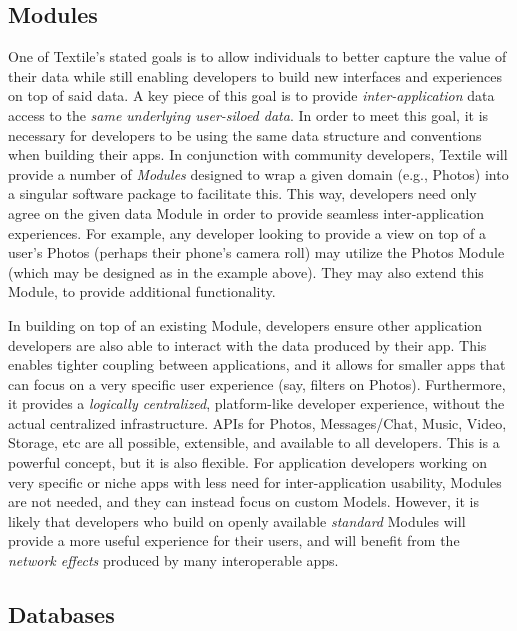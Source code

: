 \documentclass{textile}
\begin{document}
\subsection{Modules}\label{sec:modules}

One of Textile's stated goals is to allow individuals to better capture the value of their data while still enabling developers to build new interfaces and experiences on top of said data. A key piece of this goal is to provide \emph{inter-application} data access to the \emph{same underlying user-siloed data}. In order to meet this goal, it is necessary for developers to be using the same data structure and conventions when building their apps. In conjunction with community developers, Textile will provide a number of \emph{Modules} designed to wrap a given domain (e.g., Photos) into a singular software package to facilitate this. This way, developers need only agree on the given data Module in order to provide seamless inter-application experiences. For example, any developer looking to provide a view on top of a user's Photos (perhaps their phone's camera roll) may utilize the Photos Module (which may be designed as in the example above). They may also extend this Module, to provide additional functionality.

In building on top of an existing Module, developers ensure other application developers are also able to interact with the data produced by their app. This enables tighter coupling between applications, and it allows for smaller apps that can focus on a very specific user experience (say, filters on Photos). Furthermore, it provides a \emph{logically centralized}, platform-like developer experience, without the actual centralized infrastructure. APIs for Photos, Messages/Chat, Music, Video, Storage, etc are all possible, extensible, and available to all developers. This is a powerful concept, but it is also flexible. For application developers working on very specific or niche apps with less need for inter-application usability, Modules are not needed, and they can instead focus on custom Models. However, it is likely that developers who build on openly available \emph{standard} Modules will provide a more useful experience for their users, and will benefit from the \emph{network effects} \cite{shapiroInformationRulesStrategic1998} produced by many interoperable apps.

\subsection{Databases}\label{sec:databases}
\end{document}
